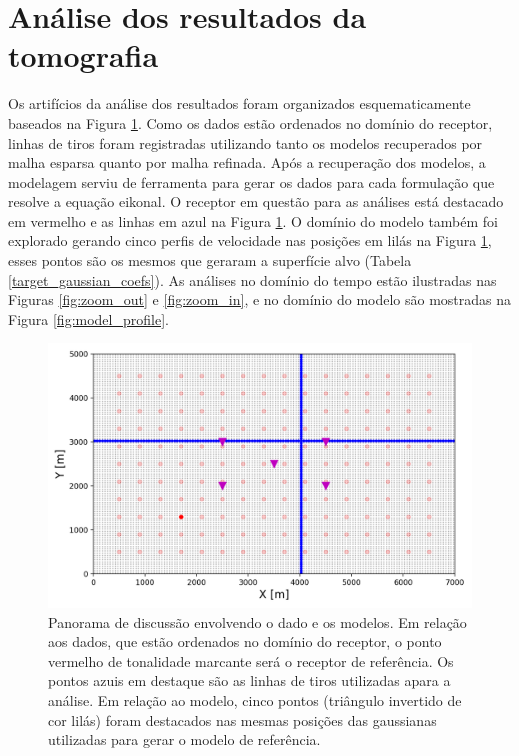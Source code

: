 \section{Análise dos resultados da tomografia} 
 
Os artifícios da análise dos resultados foram organizados esquematicamente baseados na Figura \ref{fig:discuss_geometry}. Como os dados estão ordenados no domínio do receptor, linhas de tiros foram registradas utilizando tanto os modelos recuperados por malha esparsa quanto por malha refinada. Após a recuperação dos modelos, a modelagem serviu de ferramenta para gerar os dados para cada formulação que resolve a equação eikonal. O receptor em questão para as análises está destacado em vermelho e as linhas em azul na Figura \ref{fig:discuss_geometry}. O domínio do modelo também foi explorado gerando cinco perfis de velocidade nas posições em lilás na Figura \ref{fig:discuss_geometry}, esses pontos são os mesmos que geraram a superfície alvo (Tabela \ref{target_gaussian_coefs}). As análises no domínio do tempo estão ilustradas nas Figuras \ref{fig:zoom_out} e \ref{fig:zoom_in}, e no domínio do modelo são mostradas na Figura \ref{fig:model_profile}. 
 
\begin{figure}[H]
	\centering
	\includegraphics[width=12cm,height=7cm]{Imgs/Discussoes/discuss_geometry.png}
	\caption{Panorama de discussão envolvendo o dado e os modelos. Em relação aos dados, que estão ordenados no domínio do receptor, o ponto vermelho de tonalidade marcante será o receptor de referência. Os pontos azuis em destaque são as linhas de tiros utilizadas apara a análise. Em relação ao modelo, cinco pontos (triângulo invertido de cor lilás) foram destacados nas mesmas posições das gaussianas utilizadas para gerar o modelo de referência.}
	\label{fig:discuss_geometry}	
\end{figure}

